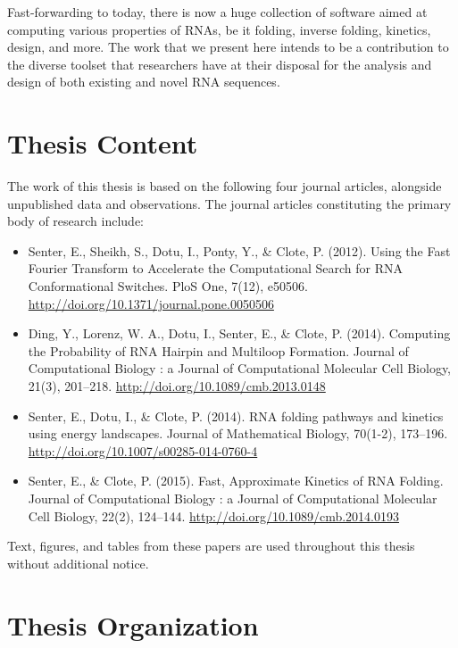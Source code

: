 Fast-forwarding to today, there is now a huge collection of software aimed at
computing various properties of RNAs, be it folding, inverse folding, kinetics,
design, and more. The work that we present here intends to be a contribution
to the diverse toolset that researchers have at their disposal for the analysis
and design of both existing and novel RNA sequences.

\section{Thesis Content}
\label{sec:intro:thesiscontent}

The work of this thesis is based on the following four journal articles, alongside
unpublished data and observations. The journal articles constituting the
primary body of research include:

\begin{itemize}
\item Senter, E., Sheikh, S., Dotu, I., Ponty, Y., \& Clote, P. (2012). Using the Fast Fourier Transform to Accelerate the Computational Search for RNA Conformational Switches. PloS One, 7(12), e50506. \url{http://doi.org/10.1371/journal.pone.0050506}
\item Ding, Y., Lorenz, W. A., Dotu, I., Senter, E., \& Clote, P. (2014). Computing the Probability of RNA Hairpin and Multiloop Formation. Journal of Computational Biology : a Journal of Computational Molecular Cell Biology, 21(3), 201–218. \url{http://doi.org/10.1089/cmb.2013.0148}
\item Senter, E., Dotu, I., \& Clote, P. (2014). RNA folding pathways and kinetics using \twoD energy landscapes. Journal of Mathematical Biology, 70(1-2), 173–196. \url{http://doi.org/10.1007/s00285-014-0760-4}
\item Senter, E., \& Clote, P. (2015). Fast, Approximate Kinetics of RNA Folding. Journal of Computational Biology : a Journal of Computational Molecular Cell Biology, 22(2), 124–144. \url{http://doi.org/10.1089/cmb.2014.0193}
\end{itemize}

Text, figures, and tables from these papers are used throughout this thesis without
additional notice.

\section{Thesis Organization}
\label{sec:intro:thesisorg}

